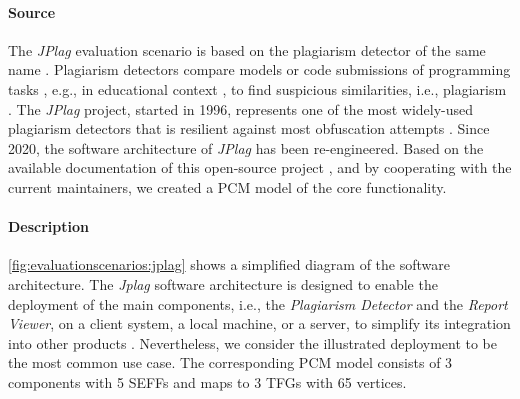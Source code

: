 \paragraph{Source}
The \emph{JPlag} evaluation scenario is based on the plagiarism detector of the same name \cite{prechelt_finding_2002}.
Plagiarism detectors compare models or code submissions of programming tasks \cite{saglam_token-based_2022}, e.g., in educational context \cite{saglam_how_2023}, to find suspicious similarities, i.e., plagiarism \cite{saglam_obfuscation-resilient_2024}.
The \emph{JPlag} project, started in 1996, represents one of the most widely-used plagiarism detectors that is resilient against most obfuscation attempts \cite{saglam_obfuscation-resilient_2024,saglam_automated_2024,saglam_detecting_2024,saglam_jplag_2024,saglam_mitigating_2025,schmid_jplag_2025}.
Since 2020, the software architecture of \emph{JPlag} has been re-engineered.
Based on the available documentation of this open-source project \cite{saglam_jplag_2024}, and by cooperating with the current maintainers, we created a \ac{PCM} model of the core functionality.

\paragraph{Description}
\autoref{fig:evaluationscenarios:jplag} shows a simplified diagram of the software architecture.
The \emph{Jplag} software architecture is designed to enable the deployment of the main components, i.e., the \emph{Plagiarism Detector} and the \emph{Report Viewer}, on a client system, a local machine, or a server, to simplify its integration into other products \cite{saglam_jplag_2024}.
Nevertheless, we consider the illustrated deployment to be the most common use case.
The corresponding \ac{PCM} model consists of 3 components with 5 \acp{SEFF} and maps to 3 \acp{TFG} with 65 vertices.

